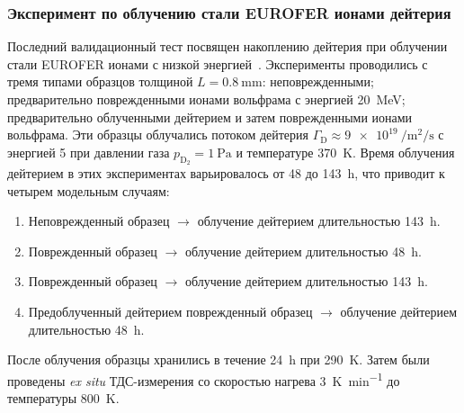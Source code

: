 \subsubsection{Эксперимент по облучению стали EUROFER ионами дейтерия}
Последний валидационный тест посвящен накоплению дейтерия при облучении стали EUROFER ионами с низкой энергией~\cite{Schmid2023_1}. Эксперименты проводились с тремя типами образцов толщиной \(L=\SI{0.8}{\milli\meter}\): неповрежденными; предварительно поврежденными ионами вольфрама с энергией \SI{20}{\mega\electronvolt}; предварительно облученными дейтерием и затем поврежденными ионами вольфрама. Эти образцы облучались потоком дейтерия $\Gamma_\mathrm{D}\approx\SI{9e19}{\per\meter\squared\per\second}$ с энергией \SI{5}{} при давлении газа $p_\mathrm{D_2}=\SI{1}{\pascal}$ и температуре \SI{370}{K}.  Время облучения дейтерием в этих экспериментах варьировалось от \num{48} до \SI{143}{\hour}, что приводит к четырем модельным случаям:
\begin{enumerate}[beginpenalty=10000]
    \item Неповрежденный образец $\rightarrow$ облучение дейтерием длительностью \SI{143}{\hour}.
    \item Поврежденный образец $\rightarrow$ облучение дейтерием длительностью \SI{48}{\hour}.
    \item Поврежденный образец $\rightarrow$ облучение дейтерием длительностью \SI{143}{\hour}.
    \item Предоблученный дейтерием поврежденный образец $\rightarrow$ облучение дейтерием длительностью \SI{48}{\hour}.
\end{enumerate}
После облучения образцы хранились в течение \SI{24}{\hour} при \SI{290}{\kelvin}. Затем были проведены \textit{ex situ} ТДС-измерения со скоростью нагрева \SI{3}{\kelvin\per\minute} до температуры \SI{800}{\kelvin}. 

